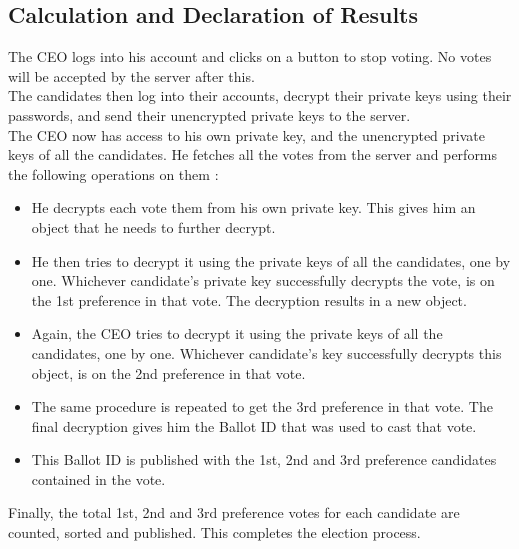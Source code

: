 \documentclass[twoside,twocolumn]{article}
\newcommand\tab[1][1cm]{\hspace*{#1}}
\begin{document}
\subsection{Calculation and Declaration of Results}
    \tab The CEO logs into his account and clicks on a button to stop voting. No votes will be accepted by the server after this.\\
    \tab The candidates then log into their accounts, decrypt their private keys using their passwords, and send their unencrypted private keys to the server.\\
    \tab The CEO now has access to his own private key, and the unencrypted private keys of all the candidates. He fetches all the votes from the server and performs the following operations on them :
    \begin{itemize}
        \item He decrypts each vote them from his own private key. This gives him an object that he needs to further decrypt.
        \item He then tries to decrypt it using the private keys of all the candidates, one by one. Whichever candidate's private key successfully decrypts the vote, is on the 1st preference in that vote. The decryption results in a new object.
        \item Again, the CEO tries to decrypt it using the private keys of all the candidates, one by one. Whichever candidate's key successfully decrypts this object, is on the 2nd preference in that vote.
        \item The same procedure is repeated to get the 3rd preference in that vote. The final decryption gives him the Ballot ID that was used to cast that vote.
        \item This Ballot ID is published with the 1st, 2nd and 3rd preference candidates contained in the vote.
    \end{itemize}
    \tab Finally, the total 1st, 2nd and 3rd preference votes for each candidate are counted, sorted and published. This completes the election process.
\end{document}
